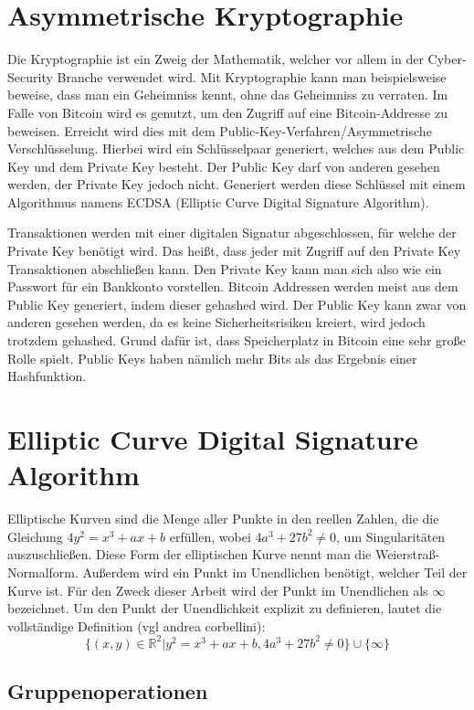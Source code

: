 \section{Asymmetrische Kryptographie}
Die Kryptographie ist ein Zweig der Mathematik, welcher vor allem in der Cyber-Security Branche verwendet wird. Mit Kryptographie
kann man beispielsweise beweise, dass man ein Geheimniss kennt, ohne das Geheimniss zu verraten. Im Falle von Bitcoin wird es 
genutzt, um den Zugriff auf eine Bitcoin-Addresse zu beweisen. Erreicht wird dies mit dem Public-Key-Verfahren/Asymmetrische
Verschlüsselung. Hierbei wird ein Schlüsselpaar generiert, welches aus dem Public Key und dem Private Key besteht. Der Public Key
darf von anderen gesehen werden, der Private Key jedoch nicht. Generiert werden diese Schlüssel mit einem Algorithmus namens
ECDSA (Elliptic Curve Digital Signature Algorithm).

Transaktionen werden mit einer digitalen Signatur abgeschlossen, für welche der Private Key benötigt wird. Das heißt, dass jeder
mit Zugriff auf den Private Key Transaktionen abschließen kann. Den Private Key kann man sich also wie ein Passwort für ein 
Bankkonto vorstellen. Bitcoin Addressen werden meist aus dem Public Key generiert, indem dieser gehashed wird. Der Public Key
kann zwar von anderen gesehen werden, da es keine Sicherheitsrisiken kreiert, wird jedoch trotzdem gehashed. Grund dafür ist,
dass Speicherplatz in Bitcoin eine sehr große Rolle spielt. Public Keys haben nämlich mehr Bits als das Ergebnis einer
Hashfunktion.

\section{Elliptic Curve Digital Signature Algorithm}
Elliptische Kurven sind die Menge aller Punkte in den reellen Zahlen, die die Gleichung $ 4y^2 = x^3 + ax + b $ erfüllen, wobei
$ 4a^3 + 27b^2 \neq 0 $, um Singularitäten auszuschließen. Diese Form der elliptischen Kurve nennt man die Weierstraß-Normalform.
Außerdem wird ein Punkt im Unendlichen benötigt, welcher Teil der Kurve ist. Für den Zweck dieser Arbeit wird der Punkt im 
Unendlichen als $\infty$ bezeichnet. Um den Punkt der Unendlichkeit explizit zu definieren, lautet die vollständige Definition (vgl andrea
corbellini): \[ \{ (x,y) \in \mathbb{R}^2 | y^2 = x^3 + ax + b, 4a^3 + 27b^2 \neq 0 \} \cup \{ \infty \} \]

\subsection{Gruppenoperationen}

